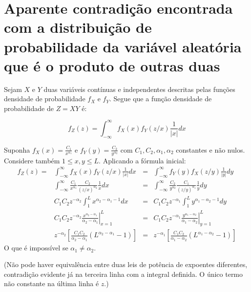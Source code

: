 \documentclass{article}
\begin{document}
\section{Aparente contradição encontrada com a distribuição de probabilidade da variável aleatória que é o produto de outras duas}


Sejam $X$ e $Y$ duas variáveis contínuas e independentes descritas
pelas funções densidade de probabilidade $f_X$ e $f_Y$.
Segue que a função densidade de probabilidade de $Z=XY$ é:

\begin{equation}
f_Z(z) = \int_{-\infty}^{\infty} f_X(x) f_Y(z/x)\frac{1}{|x|}dx
\end{equation}

\noindent Suponha 
$f_X(x)=\frac{C_1}{x^{\alpha_1}}$
e
$f_Y(y)=\frac{C_2}{y^{\alpha_2}}$
com $C_1, C_2, \alpha_1, \alpha_2$ constantes e não nulos.
Considere também $1 \leq x,y \leq L$.
Aplicando a fórmula inicial:
\begin{align}
f_Z(z) = & \int_{-\infty}^{\infty} f_X(x) f_Y(z/x)\frac{1}{|x|}dx & = & \int_{-\infty}^{\infty} f_Y(y) f_X(z/y)\frac{1}{|y|}dy\\
& \int_{-\infty}^{\infty} \frac{C_1}{x^{\alpha_1}} \frac{C_2}{(z/x)^{\alpha_2}}\frac{1}{x}dx & = & \int_{-\infty}^{\infty} \frac{C_2}{y^{\alpha_2}} \frac{C_1}{(z/y)^{\alpha_1}}\frac{1}{y}dy\\
& C_1 C_2 z^{-\alpha_2} \int_{1}^{L} x^{\alpha_2-\alpha_1-1} dx & = & C_1 C_2 z^{-\alpha_1} \int_{1}^{L} y^{\alpha_1-\alpha_2-1} dy\\
& C_1 C_2 z^{-\alpha_2} \left. \frac{x^{\alpha_2-\alpha_1}}{\alpha_2-\alpha_1}\right|_{x=1}^{L} & = & C_1 C_2 z^{-\alpha_1} \left. \frac{y^{\alpha_1-\alpha_2}}{\alpha_1-\alpha_2}\right|_{y=1}^{L}  \\
& z^{-\alpha_2} \left[ \frac{C_1 C_2}{\alpha_2-\alpha_1} (L^{\alpha_2-\alpha_1} -1)\right] & = & z^{-\alpha_1} \left[\frac{C_1 C_2}{\alpha_1-\alpha_2} (L^{\alpha_1-\alpha_2} -1)\right]
\end{align}
\noindent O que é impossível se $\alpha_1 \neq \alpha_2$.

(Não pode haver equivalência entre duas leis de potência de expoentes diferentes,
contradição evidente já na terceira linha com a integral definida.
O único termo não constante na última linha é $z$.)

\end{document}
